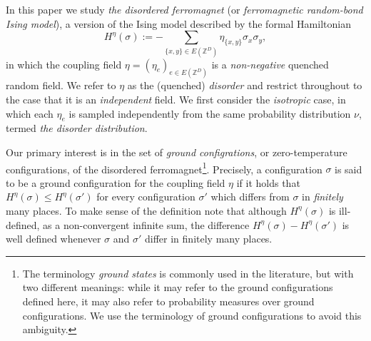 \documentclass[11pt, reqno]{amsart}
\newcommand{\Z}{\mathbb{Z}}
\numberwithin{equation}{section}
\begin{document}
In this paper we study \emph{the disordered ferromagnet} (or \emph{ferromagnetic random-bond Ising model}), a version of the Ising model described by the formal Hamiltonian 
\begin{equation}\label{eq:Disordered ferromagnet formal Hamiltonian}
H^{\eta}(\sigma):=-\sum_{\{x,y\}\in E(\Z^D)}\eta_{\{x,y\}}\sigma_x\sigma_y,
\end{equation}
in which the coupling field $\eta = (\eta_e)_{e\in E(\Z^D)}$ is a \emph{non-negative} quenched random field. We refer to $\eta$ as the (quenched) \emph{disorder} and restrict throughout to the case that it is an \emph{independent} field. We first consider the \emph{isotropic} case, in which each $\eta_e$ is sampled independently from the same probability distribution $\nu$, termed \emph{the disorder distribution}.

\smallskip
{}
Our primary interest is in the set of \emph{ground configrations}, or zero-temperature configurations, of the disordered ferromagnet\footnote{The terminology \emph{ground states} is commonly used in the literature, but with two different meanings: while it may refer to the ground configurations defined here, it may also refer to probability measures over ground configurations. We use the terminology of ground configurations to avoid this ambiguity.}.
Precisely, a configuration $\sigma$ is said to be a ground configuration for the coupling field $\eta$ if it holds that $H^\eta(\sigma)\le H^{\eta}(\sigma')$ for every configuration $\sigma'$ which differs from $\sigma$ in \emph{finitely} many places. To make sense of the definition note that although $H^\eta(\sigma)$ is ill-defined, as a non-convergent infinite sum, the difference $H^\eta(\sigma)-H^\eta(\sigma')$ is well defined whenever $\sigma$ and $\sigma'$ differ in finitely many places.
\end{document}
